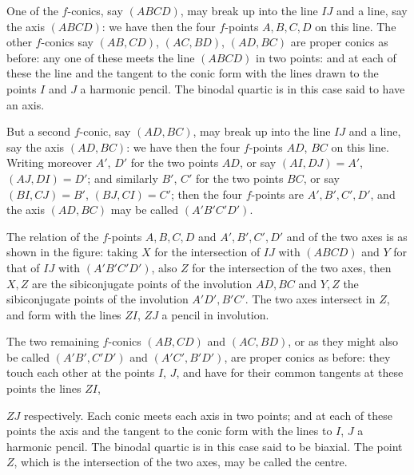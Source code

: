 \documentclass[11pt,a4paper]{article}
\begin{document}
\smallskip
One of the $f$-conics, say $(ABCD)$, may break up into the line $IJ$ and a line, say the axis $(ABCD)$: we have then the four $f$-points $A, B, C, D$ on this line. The other $f$-conics say $(AB, CD)$, $(AC, BD)$, $(AD, BC)$ are proper conics as before: any one of these meets the line $(ABCD)$ in two points: and at each of these the line and the tangent to the conic form with the lines drawn to the points $I$ and $J$ a harmonic pencil. The binodal quartic is in this case said to have an axis.

\smallskip
But a second $f$-conic, say $(AD, BC)$, may break up into the line $IJ$ and a line, say the axis $(AD, BC)$: we have then the four $f$-points $AD$, $BC$ on this line. Writing moreover $A'$, $D'$ for the two points $AD$, or say $(AI, DJ) = A'$, $(AJ, DI) = D'$; and similarly $B'$, $C'$ for the two points $BC$, or say $(BI, CJ) = B'$, $(BJ, CI) = C'$; then the four $f$-points are $A', B', C', D'$, and the axis $(AD, BC)$ may be called $(A'B'C'D')$.

\smallskip
The relation of the $f$-points $A, B, C, D$ and $A', B', C', D'$ and of the two axes is as shown in the figure: taking $X$ for the intersection of $IJ$ with $(ABCD)$ and $Y$ for that of $IJ$ with $(A'B'C'D')$, also $Z$ for the intersection of the two axes, then $X, Z$ are the sibiconjugate points of the involution $AD, BC$ and $Y, Z$ the sibiconjugate points of the involution $A'D', B'C'$. The two axes intersect in $Z$, and form with the lines $ZI$, $ZJ$ a pencil in involution.

\smallskip
The two remaining $f$-conics $(AB, CD)$ and $(AC, BD)$, or as they might also be called $(A'B', C'D')$ and $(A'C', B'D')$, are proper conics as before: they touch each other at the points $I$, $J$, and have for their common tangents at these points the lines $ZI$,

\newpage

$ZJ$ respectively. Each conic meets each axis in two points; and at each of these points the axis and the tangent to the conic form with the lines to $I$, $J$ a harmonic pencil. The binodal quartic is in this case said to be biaxial. The point $Z$, which is the intersection of the two axes, may be called the centre.
\end{document}
